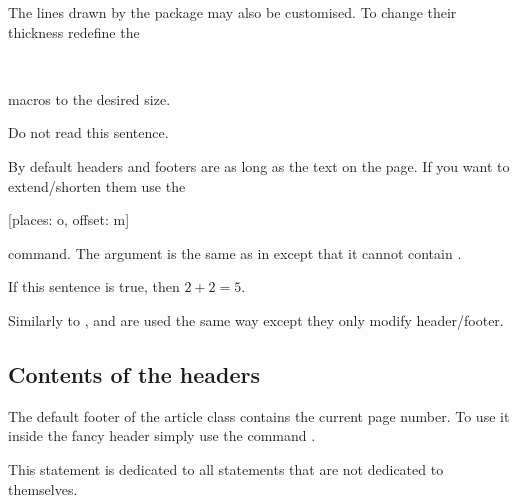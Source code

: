 The lines drawn by the  package may also be customised. To change
their thickness redefine the
\begin{lscommand}
   \\
\end{lscommand}
macros to the desired size.
\begin{example}[standalone, paperheight=3cm, paperwidth=3cm]
\geometry{includefoot, includehead, headsep=.5em, footskip=1em} %
\sloppy %
\usepackage{fancyhdr} %
\pagestyle{fancy} %
\RenewDocumentCommand{\headrulewidth}{}{.2cm}
\RenewDocumentCommand{\footrulewidth}{}{.5cm}

\noindent %
Do not read this sentence.
\end{example}

By default headers and footers are as long as the text on the page. If you want
to extend\slash{}shorten them use the
\begin{lscommand}
  [places: o, offset: m]
\end{lscommand}
command. The  argument is the same as in  except that
it cannot contain .
\begin{example}[standalone, paperheight=3cm]
\geometry{includehead, includefoot, headsep=.5em, footskip=1em} %
\sloppy %
\usepackage{fancyhdr}%
\pagestyle{fancy}%
\fancyhfoffset[L]{-1cm}
\fancyhfoffset[R]{.2cm}

\noindent %
If this sentence is true,
then \(2 + 2 = 5\).
\end{example}
Similarly to ,  and  are
used the same way except they only modify header\slash{}footer.

\subsection{Contents of the headers}

The default footer of the article class contains the current page number. To
use it inside the fancy header simply use the command .
\begin{example}[standalone, paperheight=2.5cm, to_page=2, vertical_pages]
\geometry{includehead, includefoot, headsep=.5em, footskip=1em} %
\sloppy %
\usepackage{fancyhdr}%
\pagestyle{fancy}%

\noindent %
This statement is dedicated to
all statements that are not
dedicated to themselves. 
\end{example}

